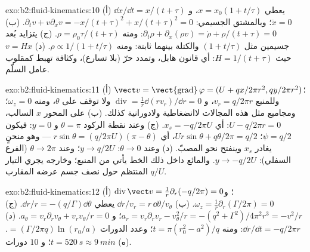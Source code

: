 \begin{solution}{exo:b2:fluid-kinematics:10}
(أ) $\dd x/\dd t = x/(t + \tau)$ يعطي $x = x_0(1 + t/\tau)$، و $\ddot x = 0$؛
وبالمشتق الجسيمي: $\partial_tv + v\partial_xv = -x/(t + \tau)^2 + x/(t + \tau)^2
= 0$. (ب) $\partial_t\rho + \partial_x(\rho v) = \dot\rho + \rho/(t + \tau) = 0$: ومنه $\rho =
\rho_0\tau/(t + \tau)$. (ج) يتزايد بُعد جسيمين مثل $(1 + t/\tau)$
والكتلة بينهما ثابتة: ومنه $\rho \propto 1/(1 + t/\tau)$. (د) $v =
Hx$ حيث $H = 1/(t + \tau)$: أي قانون هابل، وتمدد حرّ (بلا
تسارع)، وكثافة تهبط كمقلوب عامل السلّم.
\end{solution}

\begin{solution}{exo:b2:fluid-kinematics:11}
(أ) $\vect v = \operatorname{\vect{grad}}\varphi = (U + qx/2\pi r^2, qy/2\pi r^2)$؛
وللمنبع $v_r = q/2\pi r$، و $\operatorname{div} = \frac1r\dd(rv_r)/\dd r
= 0$ ولا توقف على $\theta$، ومنه $\omega_z = 0$؛ ومجاميع مثل هذه المجالات
لاانضغاطية ولادورانية كذلك. (ب) على المحور $x$ السالب،
$U - q/2\pi r = 0$: أي $x_s = -q/2\pi U$. (ج) وعند نقطة الركود $\theta =
\pi$ و $y = 0$: فيكون $\psi = q/2$؛  $Ur\sin\theta + q\theta/2\pi = q/2$،
أي $r\sin\theta = (q/2\pi U)(\pi - \theta)$ --- وهو منحنٍ يغادر $x_s$
وينفتح نحو المصبّ. (د) وعند $\theta \to 0$: $y \to q/2U$؛ وعند $\theta \to 2\pi$ (الفرع
السفلي): $y \to -q/2U$. والمائع داخل ذلك الخط يأتي من
المنبع؛ وخارجه يجري التيار المنتظم حول نصف جسم
عرضه المقارب $q/U$.
\end{solution}

\begin{solution}{exo:b2:fluid-kinematics:12}
(أ) $\operatorname{div}\vect v = \frac1r\partial_r(-q/2\pi) = 0$؛ و $\omega_z =
\frac1r\partial_r(\Gamma/2\pi) = 0$. (ب) $\dd r/v_r = r\,\dd\theta/v_\theta$ يعطي
$\dd r/r = -(q/\Gamma)\dd\theta$. (ج) $a_r = v_r\partial_rv_r - v_\theta^2/r =
-(q^2 + \Gamma^2)/4\pi^2r^3 = -v^2/r$؛ و $a_\theta = v_r\partial_rv_\theta + v_rv_\theta/r
= 0$. (د) $\dd r/\dd t = -q/2\pi r$: ومنه $t = \pi(r_0^2 - a^2)/q$؛ وعدد الدورات
$= (\Gamma/2\pi q)\ln(r_0/a)$. (ه) $t = \qty{520}{s} \approx \qty{9}{min}$؛ و $10$
دورات.
\end{solution}


